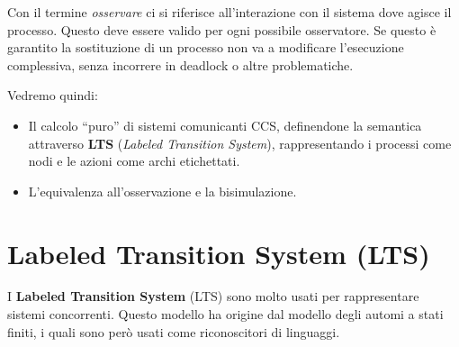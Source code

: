Con il termine \textit{osservare} ci si riferisce all'interazione con il sistema dove
agisce il processo. Questo deve essere valido per ogni possibile osservatore.
Se questo è garantito la sostituzione di un processo non va a modificare
l'esecuzione complessiva, senza incorrere in deadlock o altre problematiche.

Vedremo quindi:
\begin{itemize}
    \item Il calcolo “puro” di sistemi comunicanti CCS, definendone la semantica
          attraverso \textbf{LTS} (\textit{Labeled Transition System}), rappresentando
          i processi come nodi e le azioni come archi etichettati.
    \item L'equivalenza all'osservazione e la bisimulazione.
\end{itemize}
\section{Labeled Transition System (LTS)}
I \textbf{Labeled Transition System} (LTS) sono molto usati per rappresentare
sistemi concorrenti. Questo modello ha origine dal modello degli automi a stati
finiti, i quali sono però usati come riconoscitori di linguaggi.

